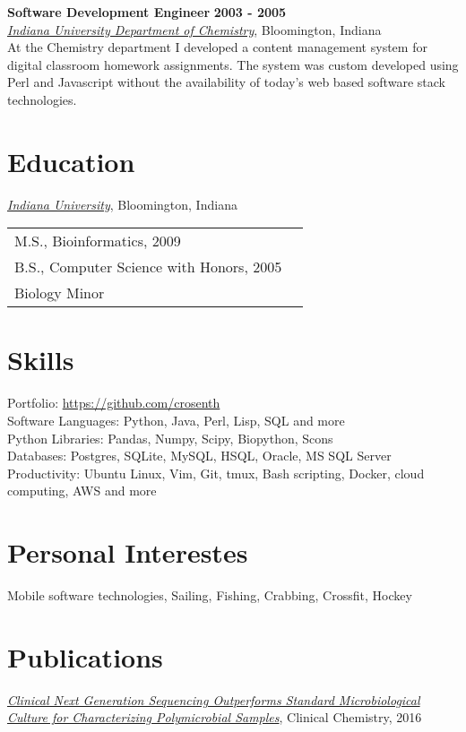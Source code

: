 \documentclass{res}
\begin{document}
\begin{resume}
\textbf{Software Development Engineer} \hfill \textbf{2003 - 2005}\\
\href{http://chem.indiana.edu/}{\textit{Indiana University Department of Chemistry}}, Bloomington, Indiana\\
 At the Chemistry department I developed a content management system for digital classroom homework assignments.
 The system was custom developed using Perl and Javascript without the availability of today's web based 
 software stack technologies.

\section{Education}
\href{http://www.iub.edu/}{\textit{Indiana University}}, Bloomington, Indiana\\
\begin{tabular}{p{10cm} l} 
M.S., Bioinformatics, 2009\\
B.S., Computer Science with Honors, 2005\\
Biology Minor
\end{tabular}

\section{Skills}
Portfolio: \url{https://github.com/crosenth}\\
Software Languages: Python, Java, Perl, Lisp, SQL and more\\
Python Libraries: Pandas, Numpy, Scipy, Biopython, Scons\\
Databases: Postgres, SQLite, MySQL, HSQL, Oracle, MS SQL Server\\
Productivity: Ubuntu Linux, Vim, Git, tmux, Bash scripting, Docker, cloud computing, AWS and more

\section{Personal Interestes}
Mobile software technologies, Sailing, Fishing, Crabbing, Crossfit, Hockey

\section{Publications}
\renewcommand{\section}[2]{}
\begin{thebibliography}{4}
    \href{http://clinchem.aaccjnls.org/content/62/11/1465}
         {\textit{Clinical Next Generation Sequencing Outperforms Standard 
                  Microbiological Culture for Characterizing 
                  Polymicrobial Samples}},
         Clinical Chemistry, 2016


\end{thebibliography}
\end{resume}
\end{document}
